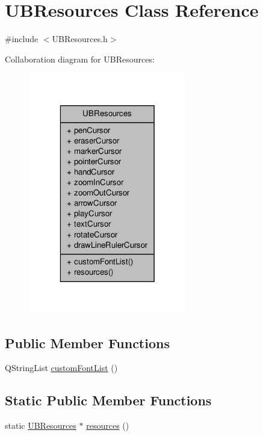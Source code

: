 \hypertarget{class_u_b_resources}{\section{U\-B\-Resources Class Reference}
\label{d8/d23/class_u_b_resources}
}


{\ttfamily \#include $<$U\-B\-Resources.\-h$>$}



Collaboration diagram for U\-B\-Resources\-:
\nopagebreak
\begin{figure}[H]
\begin{center}
\leavevmode
\includegraphics[width=196pt]{db/d2c/class_u_b_resources__coll__graph}
\end{center}
\end{figure}
\subsection*{Public Member Functions}
\begin{DoxyCompactItemize}
\item 
Q\-String\-List \hyperlink{class_u_b_resources_a72047c709be99fb3769a42d16cbbc9a3}{custom\-Font\-List} ()
\end{DoxyCompactItemize}
\subsection*{Static Public Member Functions}
\begin{DoxyCompactItemize}
\item 
static \hyperlink{class_u_b_resources}{U\-B\-Resources} $\ast$ \hyperlink{class_u_b_resources_af681f547d1374c661b79246375397337}{resources} ()
\end{DoxyCompactItemize}
